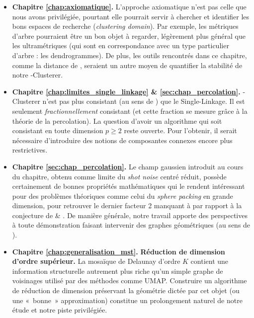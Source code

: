\begin{itemize}
    \item \textbf{Chapitre \ref{chap:axiomatique}.} L'approche axiomatique n'est pas celle que nous avons privilégiée, pourtant elle pourrait servir à chercher et identifier les bons espaces de recherche (\emph{clustering domain}). Par exemple, les métriques d'arbre pourraient être un bon objet à regarder, légèrement plus général que les ultramétriques (qui sont en correspondance avec un type particulier d'arbre : les dendrogrammes). De plus, les outils rencontrés dans ce chapitre, comme la distance de , seraient un autre moyen de quantifier la stabilité de notre \HGP-Clusterer.
    \item \textbf{Chapitre \ref{chap:limites_single_linkage} \& \ref{sec:chap_percolation}.} \HGP-Clusterer n'est pas plus consistant (au sens de ) que le Single-Linkage. Il est seulement \emph{fractionnellement} consistant (et cette fraction se mesure grâce à la théorie de la percolation). La question d'avoir un algorithme qui soit consistant en toute dimension $p \ge 2$ reste ouverte. Pour l'obtenir, il serait nécessaire d'introduire des notions de composantes connexes encore plus restrictives.
    \item \textbf{Chapitre \ref{sec:chap_percolation}.} Le champ gaussien introduit au cours du chapitre, obtenu comme limite du \emph{shot noise} centré réduit, possède certainement de bonnes propriétés mathématiques qui le rendent intéressant pour des problèmes théoriques comme celui du \emph{sphere packing} en grande dimension, pour retrouver le dernier facteur 2 manquant à \cite{Campos2023SpherePacking} par rapport à la conjecture de  \& . De manière générale, notre travail apporte des perspectives à toute démonstration faisant intervenir des graphes géométriques (au sens de ).  
    \item \textbf{Chapitre \ref{chap:generalisation_mst}.} \textbf{Réduction de dimension d'ordre supérieur.} La mosaïque de Delaunay d'ordre $K$ contient une information structurelle autrement plus riche qu'un simple graphe de voisinages utilisé par des méthodes comme UMAP. Construire un algorithme de réduction de dimension préservant la géométrie dictée par cet objet (ou une «~bonne~» approximation) constitue un prolongement naturel de notre étude et notre piste privilégiée.

\end{itemize}
